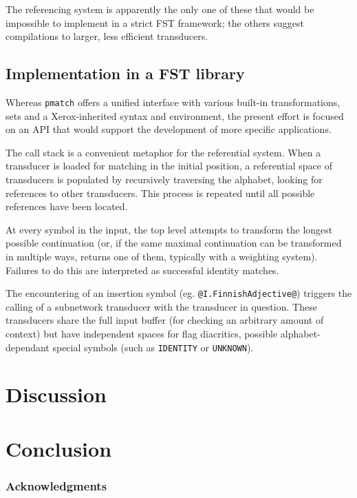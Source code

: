 \documentclass{llncs}
\begin{document}
The referencing system is apparently the only one of these that would be
impossible to implement in a strict FST framework; the others suggest
compilations to larger, less efficient transducers.

\subsection{Implementation in a FST library}

Whereas \verb!pmatch! offers a unified interface with various built-in
transformations, sets and a Xerox-inherited syntax and environment,
the present effort is focused on an API that would support the development
of more specific applications.

The call stack is a convenient metaphor for the referential system. When a
transducer is loaded for matching in the initial position, a referential space
of transducers is populated by recursively traversing the alphabet, looking
for references to other transducers. This process is repeated until all
possible references have been located.

At every symbol in the input, the top level attempts to transform the longest
possible continuation (or, if the same maximal continuation can be transformed
in multiple ways, returns one of them, typically with a weighting system).
Failures to do this are interpreted as successful identity matches.

The encountering of an insertion symbol (eg. \verb!@I.FinnishAdjective@!)
triggers the calling of a subnetwork transducer with the transducer in
question. These transducers share the full input buffer (for checking
an arbitrary amount of context) but have independent spaces for flag
diacritics, possible alphabet-dependant special symbols (such as \verb!IDENTITY!
or \verb!UNKNOWN!).

\section{Discussion}

\section{Conclusion}

\subsubsection*{Acknowledgments}




\end{document}
